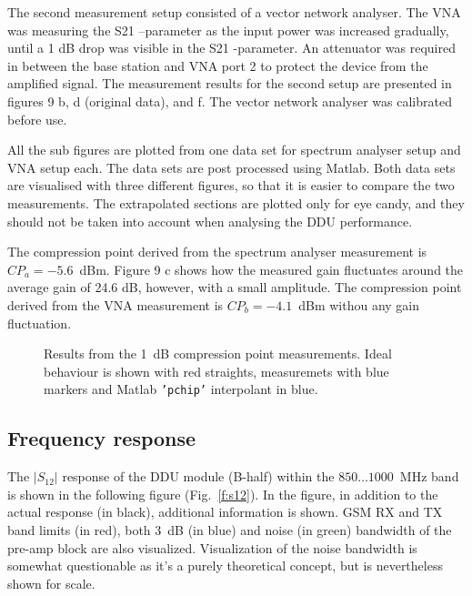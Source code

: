 \documentclass[a4paper, 12pt]{article}
\begin{document}
The second measurement setup consisted of a vector network analyser. The VNA was measuring the S21 –parameter as the input power was increased gradually, until a 1 dB drop was visible in the S21 -parameter. An attenuator was required in between the base station and VNA port 2 to protect the device from the amplified signal. The measurement results for the second setup are presented in figures 9 b, d (original data), and f. The vector network analyser was calibrated before use. 

All the sub figures are plotted from one data set for spectrum analyser setup and VNA setup each. The data sets are post processed using Matlab. Both data sets are visualised with three different figures, so that it is easier to compare the two measurements. The extrapolated sections are plotted only for eye candy, and they should not be taken into account when analysing the DDU performance.

The compression point derived from the spectrum analyser measurement is $CP_a = -5.6$~dBm. Figure 9 c shows how the measured gain fluctuates around the average gain of 24.6 dB, however, with a small amplitude. The compression point derived from the VNA measurement is $CP_b = -4.1$~dBm withou any gain fluctuation.


\begin{figure}
\centering
{}
\caption{Results from the 1~dB compression point measurements. Ideal behaviour is shown with red straights, 
	measuremets with blue markers and Matlab \texttt{'pchip'} interpolant in blue.}\label{f:1dB}
\end{figure}

\newpage
\subsection{Frequency response}

The $|S_{12}|$ response of the DDU module (B-half) within the $850 \ldots 1000$~MHz band 
is shown in the following figure (Fig.~\ref{f:s12}). In the figure, in addition to the 
actual response (in black), additional information is shown. GSM RX and TX band limits 
(in red), both 3~dB (in blue) and noise (in green) bandwidth of the pre-amp block are also 
visualized. Visualization of the noise bandwidth is somewhat questionable as it's a purely 
theoretical concept, but is nevertheless shown for scale. 
\end{document}

